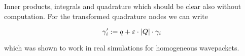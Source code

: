 \begin{chapter}{Inner products, integrals and quadrature}
which should be clear also without computation. For the transformed quadrature
nodes we can write

\begin{equation}
  \gamma^{\prime}_i := q + \varepsilon \cdot |Q| \cdot \gamma_i
\end{equation}

which was shown to work in real simulations for homogeneous wavepackets.


%
%
%
%

\end{chapter}
